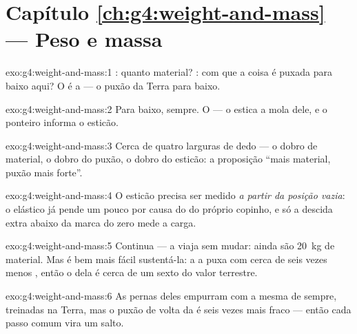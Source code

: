 \section*{Capítulo \ref{ch:g4:weight-and-mass} --- Peso e massa}

\begin{solution}{exo:g4:weight-and-mass:1}
: quanto material? : com que  a coisa é puxada para
baixo aqui? O  é a  --- o puxão da Terra para baixo.
\end{solution}

\begin{solution}{exo:g4:weight-and-mass:2}
Para baixo, sempre. O  --- o  estica a mola dele, e o
ponteiro informa o esticão.
\end{solution}

\begin{solution}{exo:g4:weight-and-mass:3}
Cerca de quatro larguras de dedo --- o dobro de material, o dobro do
puxão, o dobro do esticão: a proposição ``mais material, puxão mais
forte''.
\end{solution}

\begin{solution}{exo:g4:weight-and-mass:4}
O esticão precisa ser medido \emph{a partir da posição vazia}: o
elástico já pende um pouco por causa do  do próprio copinho, e só
a descida extra abaixo da marca do zero mede a carga.
\end{solution}

\begin{solution}{exo:g4:weight-and-mass:5}
Continua --- a  viaja sem mudar: ainda são \qty{20}{kg} de
material. Mas é bem mais fácil sustentá-la: a  a puxa com cerca de
seis vezes menos , então o  dela é cerca de um sexto do
valor terrestre.
\end{solution}

\begin{solution}{exo:g4:weight-and-mass:6}
As pernas deles empurram com a mesma  de sempre, treinadas na
Terra, mas o puxão de volta da  é seis vezes mais fraco --- então
cada passo comum vira um salto.
\end{solution}

